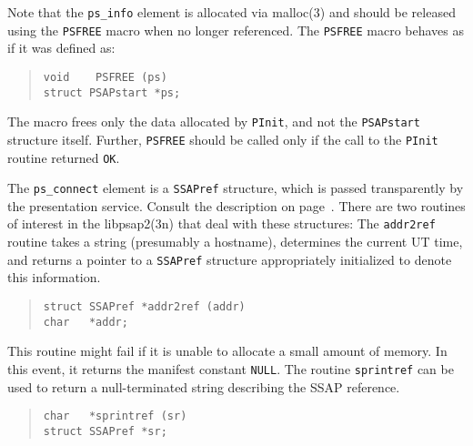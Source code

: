 Note that the \verb"ps_info" element is allocated via \man malloc(3) and
should be released using the \verb"PSFREE" macro when no longer referenced.
The \verb"PSFREE" macro behaves as if it was defined as:
\begin{quote}\small\begin{verbatim}
void    PSFREE (ps)
struct PSAPstart *ps;
\end{verbatim}\end{quote}
The macro frees only the data allocated by \verb"PInit",
and not the \verb"PSAPstart" structure itself.
Further,
\verb"PSFREE" should be called only if the call to the \verb"PInit"
routine returned \verb"OK".

The \verb"ps_connect" element is a \verb"SSAPref" structure,
which is passed transparently by the presentation service.
Consult the description on page~\pageref{SSAPref}.
There are two routines of interest in the \man libpsap2(3n) that deal with
these structures:
The \verb"addr2ref" routine takes a string (presumably a hostname),
determines the current UT time,
and returns a pointer to a \verb"SSAPref" structure appropriately initialized
to denote this information.
\begin{quote}\small\begin{verbatim}
struct SSAPref *addr2ref (addr)
char   *addr;
\end{verbatim}\end{quote}
This routine might fail if it is unable to allocate a small amount of
memory.
In this event, it returns the manifest constant \verb"NULL".
The routine \verb"sprintref" can be used to return a null-terminated string
describing the SSAP reference.
\begin{quote}\small\begin{verbatim}
char   *sprintref (sr)
struct SSAPref *sr;
\end{verbatim}\end{quote}

